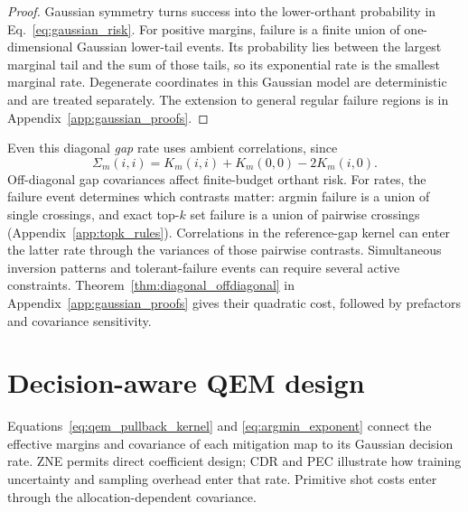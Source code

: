 \documentclass[a4paper,onecolumn,unpublished,nopdfoutputerror]{quantumarticle}
\theoremstyle{plain}
\theoremstyle{definition}
\newcommand{\1}{\mathbf{1}}
\begin{document}
\begin{proof}
Gaussian symmetry turns success into the lower-orthant probability in Eq.~\eqref{eq:gaussian_risk}. For positive margins, failure is a finite union of one-dimensional Gaussian lower-tail events. Its probability lies between the largest marginal tail and the sum of those tails, so its exponential rate is the smallest marginal rate. Degenerate coordinates in this Gaussian model are deterministic and are treated separately. The extension to general regular failure regions is in Appendix~\ref{app:gaussian_proofs}.
\end{proof}

Even this diagonal \emph{gap} rate uses ambient correlations, since
\[
\Sigma_m(i,i)=K_m(i,i)+K_m(0,0)-2K_m(i,0).
\]
Off-diagonal gap covariances affect finite-budget orthant risk. For rates, the failure event determines which contrasts matter: argmin failure is a union of single crossings, and exact top-$k$ set failure is a union of pairwise crossings (Appendix~\ref{app:topk_rules}). Correlations in the reference-gap kernel can enter the latter rate through the variances of those pairwise contrasts. Simultaneous inversion patterns and tolerant-failure events can require several active constraints. Theorem~\ref{thm:diagonal_offdiagonal} in Appendix~\ref{app:gaussian_proofs} gives their quadratic cost, followed by prefactors and covariance sensitivity.

\section{Decision-aware QEM design}
\label{sec:qem_design}

Equations~\eqref{eq:qem_pullback_kernel} and \eqref{eq:argmin_exponent} connect the effective margins and covariance of each mitigation map to its Gaussian decision rate. ZNE permits direct coefficient design; CDR and PEC illustrate how training uncertainty and sampling overhead enter that rate. Primitive shot costs enter through the allocation-dependent covariance.
\end{document}
